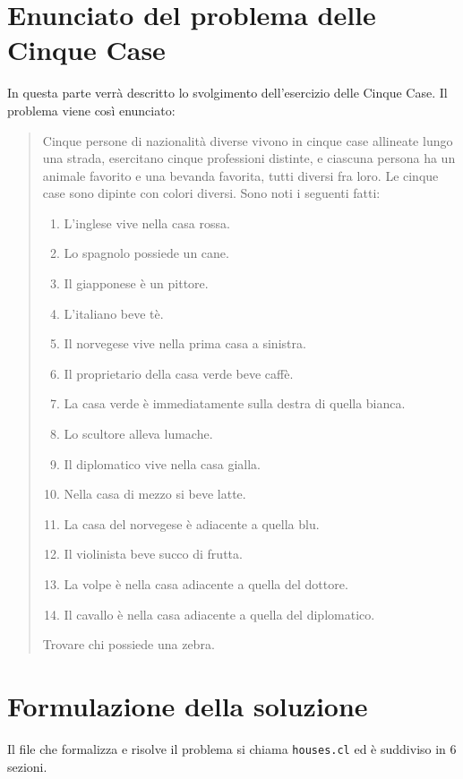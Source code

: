 \chapter{Enunciato del problema delle Cinque Case}
In questa parte verrà descritto lo svolgimento dell'esercizio delle Cinque Case.
Il problema viene così enunciato:
\small{\begin{quote}
    Cinque persone di nazionalità diverse vivono in cinque case allineate lungo una
    strada, esercitano cinque professioni distinte, e ciascuna persona ha un animale favorito e una
    bevanda favorita, tutti diversi fra loro. Le cinque case sono dipinte con colori diversi. Sono noti i
    seguenti fatti:
    \begin{enumerate}
        \item{L’inglese vive nella casa rossa.}
        \item{Lo spagnolo possiede un cane.}
        \item{Il giapponese è un pittore.}
        \item{L’italiano beve tè.}
        \item{Il norvegese vive nella prima casa a sinistra.}
        \item{Il proprietario della casa verde beve caffè.}
        \item{La casa verde è immediatamente sulla destra di quella bianca.}
        \item{Lo scultore alleva lumache.}
        \item{Il diplomatico vive nella casa gialla.}
        \item{Nella casa di mezzo si beve latte.}
        \item{La casa del norvegese è adiacente a quella blu.}
        \item{Il violinista beve succo di frutta.}
        \item{La volpe è nella casa adiacente a quella del dottore.}
        \item{Il cavallo è nella casa adiacente a quella del diplomatico.}
    \end{enumerate}
    Trovare chi possiede una zebra.
\end{quote}}

\chapter{Formulazione della soluzione}
Il file che formalizza e risolve il problema si chiama \texttt{houses.cl} ed è suddiviso in 6 sezioni.
